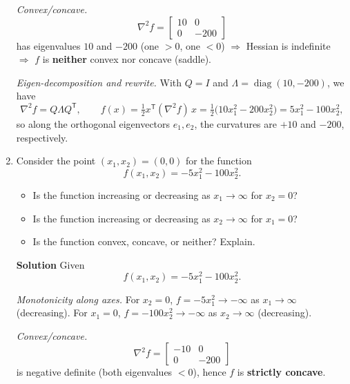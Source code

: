 \documentclass[11pt]{article}
\begin{document}
\begin{enumerate}[label=3(\alph*)]
		\emph{Convex/concave.}
		\[
		\nabla^2 f=\begin{bmatrix}10&0\\[2pt]0&-200\end{bmatrix}
		\]
		has eigenvalues $10$ and $-200$ (one $>0$, one $<0$) $\Rightarrow$ Hessian is indefinite $\Rightarrow$ $f$ is \textbf{neither} convex nor concave (saddle).
		
		\emph{Eigen-decomposition and rewrite.}
		With $Q=I$ and $\Lambda=\operatorname{diag}(10,-200)$, we have
		\[
		\nabla^2 f = Q\Lambda Q^{\mathsf T},\qquad
		f(x)=\tfrac12 x^{\mathsf T}(\nabla^2 f)\,x=\tfrac12\big(10x_1^2-200x_2^2\big)=5x_1^2-100x_2^2,
		\]
		so along the orthogonal eigenvectors $e_1,e_2$, the curvatures are $+10$ and $-200$, respectively.

		\item Consider the point $(x_1, x_2) = (0,0)$ for the function
		\[
		f(x_1,x_2) = -5 x_1^{2} - 100 x_2^{2}.
		\]
		\begin{itemize}
			\item Is the function increasing or decreasing as $x_1 \to \infty$ for $x_2 = 0$?
			\item Is the function increasing or decreasing as $x_2 \to \infty$ for $x_1 = 0$?
			\item Is the function convex, concave, or neither? Explain.
		\end{itemize}
		\textbf{Solution}
		Given
		\[
		f(x_1,x_2) = -5x_1^2 - 100x_2^2.
		\]
		
		\emph{Monotonicity along axes.}
		For $x_2=0$, $f=-5x_1^2 \to -\infty$ as $x_1\to\infty$ (decreasing).
		For $x_1=0$, $f=-100x_2^2 \to -\infty$ as $x_2\to\infty$ (decreasing).
		
		\emph{Convex/concave.}
		\[
		\nabla^2 f=\begin{bmatrix}-10&0\\[2pt]0&-200\end{bmatrix}
		\]
		is negative definite (both eigenvalues $<0$), hence $f$ is \textbf{strictly concave}.

	\end{enumerate}
\end{document}
